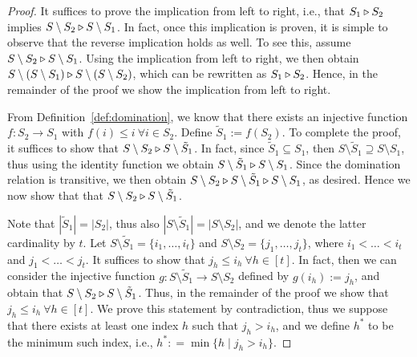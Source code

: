\begin{proof}
It suffices to prove the implication from left to right, i.e., that $S_1\triangleright S_2$ implies $S \setminus S_2 \triangleright S \setminus S_1$.
In fact, once this implication is proven, it is simple to observe that the reverse implication holds as well. 
To see this, assume $S \setminus S_2 \triangleright S \setminus S_1$.
Using the implication from left to right, we then obtain $S \setminus (S \setminus S_1) \triangleright S \setminus (S \setminus S_2)$, which can be rewritten as $S_1 \triangleright S_2$.
Hence, in the remainder of the proof we show the implication from left to right.



From Definition~\ref{def:domination}, we know that there exists an injective function $f: S_2 \to S_1$ with $f(i) \leq i \ \forall i \in S_2$.
Define $\tilde S_1 := f(S_2)$.
To complete the proof, it suffices to show that $S \setminus S_2 \triangleright S \setminus \tilde S_1$.
In fact, since $\tilde S_1 \subseteq S_1$, then $S \setminus \tilde S_1 \supseteq S \setminus S_1$, thus using the identity function we obtain $S \setminus \tilde S_1 \triangleright S \setminus S_1$.
Since the domination relation is transitive, we then obtain $S \setminus S_2 \triangleright S \setminus \tilde S_1 \triangleright S \setminus S_1$, as desired.
Hence we now show that that $S \setminus S_2 \triangleright S \setminus \tilde S_1$.

Note that $|\tilde S_1| = |S_2|$, thus also $|S \setminus \tilde S_1| = |S \setminus S_2|$, and we denote the latter cardinality by $t$.
Let $S \setminus \tilde S_1 = \{i_1, \ldots, i_t\}$ and $S \setminus S_2 = \{j_1, \ldots, j_t\}$, where $i_1 < \ldots < i_t$ and $j_1 < \ldots < j_t$. 
It suffices to show that $j_h \leq i_h \ \forall h \in [t]$.
In fact, then we can consider the injective function $g: S \setminus \tilde S_1 \to S \setminus S_2$ defined by $g(i_h) := j_h$, and obtain that $S \setminus S_2 \triangleright S \setminus \tilde S_1$.
Thus, in the remainder of the proof we show that $j_h \leq i_h \ \forall h \in [t]$.
We prove this statement by contradiction, thus we suppose that there exists at least one index $h$ such that $j_h > i_h$, and we define $h^*$ to be the minimum such index, i.e., $h^*: = \min\{h \mid j_h > i_h\}$.


\end{proof}
